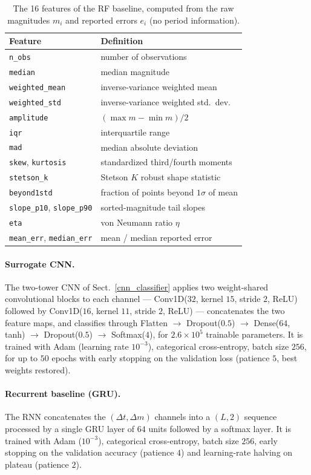 \documentclass{aa}
\begin{document}
\begin{table}[htbp]\centering
\caption{The 16 features of the RF baseline, computed from the raw
magnitudes $m_i$ and reported errors $e_i$ (no period information).}
\label{tab:fats16}
\small
\setlength{\tabcolsep}{4pt}
\begin{tabular}{ll}
\toprule
Feature & Definition \\
\midrule
\texttt{n\_obs} & number of observations \\
\texttt{median} & median magnitude \\
\texttt{weighted\_mean} & inverse-variance weighted mean \\
\texttt{weighted\_std} & inverse-variance weighted std.\ dev. \\
\texttt{amplitude} & $(\max m - \min m)/2$ \\
\texttt{iqr} & interquartile range \\
\texttt{mad} & median absolute deviation \\
\texttt{skew}, \texttt{kurtosis} & standardized third/fourth moments \\
\texttt{stetson\_k} & Stetson $K$ robust shape statistic \\
\texttt{beyond1std} & fraction of points beyond $1\sigma$ of mean \\
\texttt{slope\_p10}, \texttt{slope\_p90} & sorted-magnitude tail slopes \\
\texttt{eta} & von Neumann ratio $\eta$ \\
\texttt{mean\_err}, \texttt{median\_err} & mean / median reported error \\
\bottomrule
\end{tabular}
\end{table}

\paragraph{Surrogate CNN.}
The two-tower CNN of Sect.~\ref{cnn_classifier} applies two
weight-shared convolutional blocks to each channel --- Conv1D($32$,
kernel $15$, stride $2$, ReLU) followed by Conv1D($16$, kernel $11$,
stride $2$, ReLU) --- concatenates the two feature maps, and classifies
through Flatten $\to$ Dropout($0.5$) $\to$ Dense($64$, tanh) $\to$
Dropout($0.5$) $\to$ Softmax($4$), for $2.6\times10^{5}$ trainable
parameters. It is trained with Adam (learning rate $10^{-3}$),
categorical cross-entropy, batch size $256$, for up to $50$ epochs with
early stopping on the validation loss (patience $5$, best weights
restored).

\paragraph{Recurrent baseline (GRU).}
The RNN concatenates the $(\Delta t, \Delta m)$ channels into a
$(L, 2)$ sequence processed by a single GRU layer of $64$ units followed
by a softmax layer. It is trained with Adam ($10^{-3}$), categorical
cross-entropy, batch size $256$, early stopping on the validation
accuracy (patience $4$) and learning-rate halving on plateau
(patience $2$).
\end{document}
